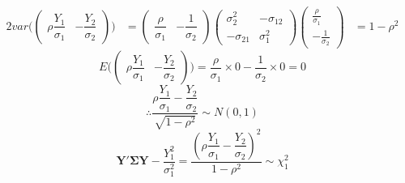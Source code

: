 \documentclass[a4papers]{ctexart}
\begin{document}
\begin{alignat*}{2}
    var\Bigg( \begin{pmatrix} \rho \dfrac {Y_{1}}{\sigma _{1}} & -\dfrac {Y_{2}}{\sigma _{2}} \end{pmatrix} \Bigg) 
    &= \begin{pmatrix} \dfrac{\rho}{\sigma_1} & -\dfrac{1}{\sigma_2} \end{pmatrix} 
       \begin{pmatrix}\sigma_2^2 & -\sigma_{12} \\ -\sigma_{21} & \sigma_1^2 \end{pmatrix}
       \begin{pmatrix} \frac{\rho}{\sigma_1} \\ -\frac{1}{\sigma_2} \end{pmatrix} 
    &= 1-\rho^2
\end{alignat*}
\[  
    E\Bigg(
            \begin{pmatrix} \rho \dfrac {Y_{1}}{\sigma _{1}} & -\dfrac {Y_{2}}{\sigma _{2}} \end{pmatrix}
    \Bigg) 
    = \dfrac {\rho}{\sigma _{1}}\times 0 -\dfrac {1}{\sigma _{2}}\times 0 = 0
\]
\[ \therefore \dfrac{ \rho \dfrac {Y_{1}}{\sigma _{1}}-\dfrac {Y_{2}}{\sigma _{2}}}{\sqrt{1-\rho^2}} \sim N(0,1) \]
\[ \boldsymbol{Y}' \boldsymbol{\Sigma}\boldsymbol{Y} - \dfrac{Y_1^2}{\sigma_1^2}
    = \dfrac {\left( \rho \dfrac {Y_{1}}{\sigma _{1}}-\dfrac {Y_{2}}{\sigma _{2}}\right) ^{2}}{1-\rho ^{2}} \sim \chi^2_1
\]


    
\end{document}
